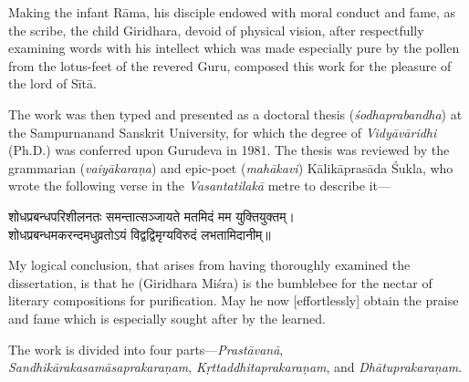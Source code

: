 \vspace{-2mm}
\begin{sloppypar}\justifying\noindent\hspace{10mm} {\engtextfont \lqtwo Making the infant Rāma, his disciple endowed with moral conduct and fame, as the scribe, the child Giridhara, devoid of physical vision, after respectfully examining words with his intellect which was made especially pure by the pollen from the lotus-feet of the revered Guru, composed this work for the pleasure of the lord of Sītā.\rqtwo}\end{sloppypar}
\begin{sloppypar}\justifying\noindent\hspace{10mm} {\engtextfont The work was then typed and presented as a doctoral thesis (\textit{śodha\-prabandha}) at the Sampurnanand Sanskrit University, for which the degree of \textit{Vidyāvāridhi} (Ph.D.) was conferred upon Gurudeva in 1981. The thesis was reviewed by the grammarian (\textit{vaiyākaraṇa}) and epic-poet (\textit{mahākavi}) Kālikāprasāda Śukla, who wrote the following verse in the \textit{Vasantatilakā} metre to describe it—}\end{sloppypar}
\vspace{-2mm}
\begin{center}
शोधप्रबन्धपरिशीलनतः समन्तात्सञ्जायते मतमिदं मम युक्तियुक्तम्।\nopagebreak\\
शोधप्रबन्धमकरन्दमधुव्रतोऽयं विद्वद्विमृग्यविरुदं लभतामिदानीम्॥
\end{center}
\vspace{-2mm}
\begin{sloppypar}\justifying\noindent\hspace{10mm} {\engtextfont \lqtwo My logical conclusion, that arises from having thoroughly examined the dissertation, is that he (Giridhara Miśra) is the bumblebee for the nectar of literary compositions for purification. May he now [effortlessly] obtain the praise and fame which is especially sought after by the learned.\rqtwo}\end{sloppypar}
\begin{sloppypar}\justifying\noindent\hspace{10mm} {\engtextfont The work is divided into four parts—\textit{Prastāvanā}, \textit{Sandhi\-kāraka\-samāsa\-prakaraṇam}, \textit{Kṛttaddhita\-prakaraṇam}, and \textit{Dhātu\-prakaraṇam}.}\end{sloppypar}
